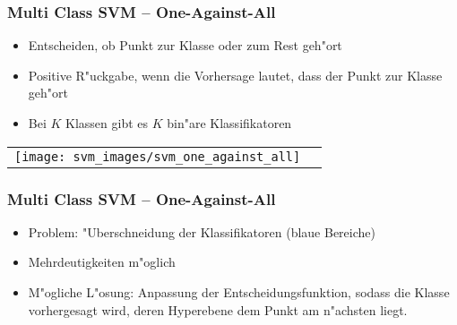 
\begin{frame}

\frametitle{Multi Class SVM -- One-Against-All}

\begin{itemize}
	\setlength{\itemsep}{9pt}
	\item Entscheiden, ob Punkt zur Klasse oder zum Rest geh"ort
	\item Positive R"uckgabe, wenn die Vorhersage lautet, dass der Punkt zur Klasse geh"ort
	\item Bei $K$ Klassen gibt es $K$ bin"are Klassifikatoren
\end{itemize}

\center
\begin{tabular}[h]{cl}
\texttt{[image: svm\_images/svm\_one\_against\_all]} &  {\tiny \cite{svmsuccinctly}}
\end{tabular}

\end{frame}






\begin{frame}

\frametitle{Multi Class SVM -- One-Against-All}

\begin{itemize}
	\setlength{\itemsep}{20pt}
	\item Problem: "Uberschneidung der Klassifikatoren (blaue Bereiche)
	\item Mehrdeutigkeiten m"oglich
	\item M"ogliche L"osung: Anpassung der Entscheidungsfunktion, sodass die Klasse vorhergesagt wird, deren Hyperebene dem Punkt am n"achsten liegt.
\end{itemize}

\end{frame}






